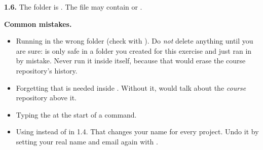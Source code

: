 \textbf{1.6.} The folder is . The file may contain  or .

\textbf{Common mistakes.}
\begin{itemize}
  \item Running  in the wrong folder (check with ). Do \emph{not} delete anything until you are sure:  is only safe in a folder you created for this exercise and just ran  in by mistake. Never run it inside  itself, because that would erase the course repository's history.
  \item Forgetting that  is needed inside . Without it,  would talk about the \emph{course} repository above it.
  \item Typing the \code{\$} at the start of a command.
  \item Using  instead of  in 1.4. That changes your name for every project. Undo it by setting your real name and email again with .
\end{itemize}
